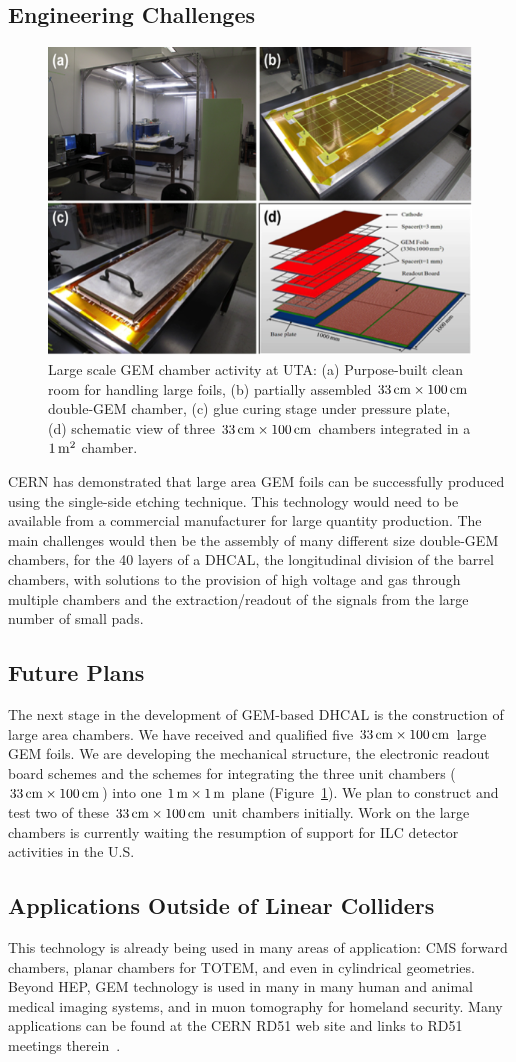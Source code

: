 \subsection{Engineering Challenges}
\begin{figure}
	\centering
	\includegraphics[width=.5\textwidth]{Calorimeter/GEM_HCAL/activitySummary}
	\caption{Large scale GEM chamber activity at UTA: (a) Purpose-built clean room for handling large foils,
(b) partially assembled $\unit[33]{cm} \times \unit[100]{cm}$ double-GEM chamber, (c) glue curing stage under pressure plate,
(d) schematic view of three $\unit[33]{cm} \times \unit[100]{cm}$ chambers integrated in a $\unit[1]{m^2}$ chamber.}
	\label{fig:Calorimeter:GEM:activitySummary}
\end{figure}
CERN has demonstrated that large area GEM foils can be successfully produced using the single-side etching technique. This technology would need to be available from a commercial manufacturer for large quantity production. The main challenges would then be the assembly of many different size double-GEM chambers, for the 40 layers of a DHCAL, the longitudinal division of the barrel chambers, with solutions to the provision of high voltage and gas through multiple chambers and the extraction/readout of the signals from the large number of small pads.
\subsection{Future Plans}
The next stage in the development of GEM-based DHCAL is the construction of large area chambers. We have received and qualified five $\unit[33]{cm}\times\unit[100]{cm}$ large GEM foils. We are developing the mechanical structure, the electronic readout board schemes and the schemes for integrating the three unit chambers ($\unit[33]{cm}\times\unit[100]{cm}$) into one $\unit[1]{m}\times\unit[1]{m}$ plane (Figure~\ref{fig:Calorimeter:GEM:activitySummary}). We plan to construct and test two of these $\unit[33]{cm}\times\unit[100]{cm}$ unit chambers initially.
Work on the large chambers is currently waiting the resumption of support for ILC detector activities in the U.S.

\subsection{Applications Outside of Linear Colliders}
This technology is already being used in many areas of application: CMS forward chambers, planar chambers for TOTEM, and even in cylindrical geometries. Beyond HEP, GEM technology is used in many in many human and animal medical imaging systems, and in muon tomography for homeland security. Many applications can be found at the CERN RD51 web site and links to RD51 meetings therein~\cite{RD51Collaboration}.
